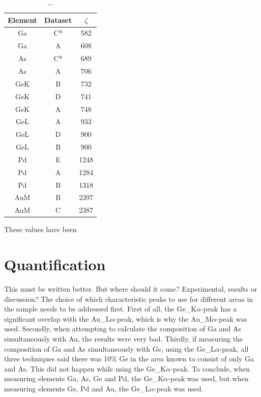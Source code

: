 \begin{table}
	\caption{...}
	\begin{center}
	\begin{tabular}{ccc}

	Element & Dataset & $\zeta$\\ 
	\midrule
	\hline
	Ga & C* & 582\\
	Ga & A  & 608\\
	As & C* & 689\\
	As & A  & 706\\
	GeK & B  & 732\\
	GeK & D  & 741\\
	GeK & A  & 748\\
	GeL & A & 933\\
	GeL & D & 900\\
	GeL & B & 900\\
	Pd & E  & 1248\\
	Pd & A  & 1284\\
	Pd & B  & 1318\\
	AuM & B & 2397\\
	AuM & C & 2387\\
	\hline
	\end{tabular}
	\end{center}
	\label{tab:non-heated zeta-values}
\end{table}

These values have been 


\section{Quantification}

This must be written better. But where should it come? Experimental, results or discussion?
The choice of which characteristic peaks to use for different areas in the sample needs to be addressed first. First of all, the Ge\_{K$\alpha$}-peak has a significant overlap with the Au\_{L$\alpha$}-peak, which is why the Au\_{M$\alpha$}-peak was used. Secondly, when attempting to calculate the composition of Ga and As simultaneously with Au, the results were very bad. Thirdly, if measuring the composition of Ga and As simultaneously with Ge, using the Ge\_{L$\alpha$}-peak, all three techniques said there was 10\% Ge in the area known to consist of only Ga and As. This did not happen while using the Ge\_{K$\alpha$}-peak. To conclude, when measuring elements Ga, As, Ge and Pd, the Ge\_{K$\alpha$}-peak was used, but when measuring elements Ge, Pd and Au, the Ge\_{L$\alpha$}-peak was used.

